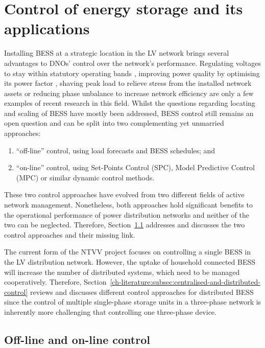 \section{Control of energy storage and its applications}
\label{ch-literature:sec:control-of-energy-storage}

Installing BESS at a strategic location in the LV network brings several advantages to DNOs' control over the network's performance.
Regulating voltages to stay within statutory operating bands \cite{Yang2014}, improving power quality by optimising its power factor \cite{Chua2012b}, shaving peak load to relieve stress from the installed network assets \cite{Bennett2015} or reducing phase unbalance to increase network efficiency \cite{Wang2015b} are only a few examples of recent research in this field.
Whilst the questions regarding locating and scaling of BESS have mostly been addressed, BESS control still remains an open question and can be split into two complementing yet unmarried approaches:

\begin{enumerate}
	\item ``off-line'' control, using load forecasts and BESS schedules; and
	\item ``on-line'' control, using Set-Points Control (SPC), Model Predictive Control (MPC) or similar dynamic control methods.
\end{enumerate}

These two control approaches have evolved from two different fields of active network management.
Nonetheless, both approaches hold significant benefits to the operational performance of power distribution networks and neither of the two can be neglected.
Therefore, Section~\ref{ch-literature:subsec:off-line-and-on-line-control} addresses and discusses the two control approaches and their missing link.

The current form of the NTVV project focuses on controlling a single BESS in the LV distribution network.
However, the uptake of household connected BESS will increase the number of distributed systems, which need to be managed cooperatively.
Therefore, Section~\ref{ch-literature:subsec:centralised-and-distributed-control} reviews and discusses different control approaches for distributed BESS since the control of multiple single-phase storage units in a three-phase network is inherently more challenging that controlling one three-phase device.

\subsection{Off-line and on-line control}
\label{ch-literature:subsec:off-line-and-on-line-control}

